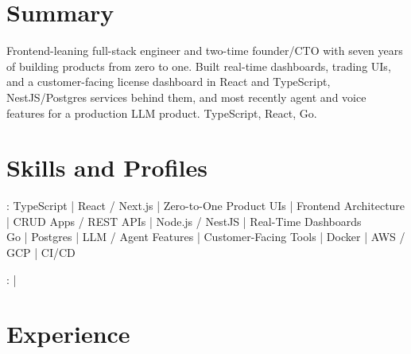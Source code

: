 \documentclass[print]{jack-resume}
\begin{document}
\pagecolor{darkmodeBackground}


\begin{minipage}[t][1cm][t]{.03\textwidth}
    \hfill
\end{minipage}

\section{Summary}
Frontend-leaning full-stack engineer and two-time founder/CTO with seven years of building products from zero to one. Built real-time dashboards, trading UIs, and a customer-facing license dashboard in React and TypeScript, NestJS/Postgres services behind them, and most recently agent and voice features for a production LLM product. TypeScript, React, Go.
\sectionsep

\section{Skills and Profiles}
:
TypeScript \hfill | \hfill
React / Next.js \hfill | \hfill
Zero-to-One Product UIs \hfill | \hfill
Frontend Architecture \hfill | \hfill
CRUD Apps / REST APIs \hfill | \hfill
Node.js / NestJS \hfill | \hfill
Real-Time Dashboards \\
\hspace{1.0cm} Go \hfill | \hfill
Postgres \hfill | \hfill
LLM / Agent Features \hfill | \hfill
Customer-Facing Tools \hfill | \hfill
Docker \hfill | \hfill
AWS / GCP \hfill | \hfill
CI/CD \\

\raggedright{
    :
      \href{https://www.linkedin.com/in/jack-sturtevant/}{ \ExternalLink} |
     \href{https://github.com/jacksturt}{ \ExternalLink}}

\section{Experience}
\end{document}
